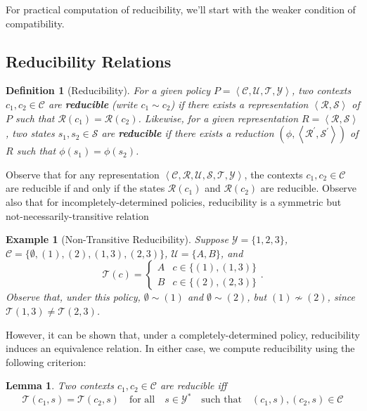 \documentclass[a4paper,10pt]{article}
\def\1{^{\prime}}
\def\T{\mathcal{T}}
\def\Y{\mathcal{Y}}
\def\C{\mathcal{C}}
\def\U{\mathcal{U}}
\def\R{\mathcal{R}}
\def\S{\mathcal{S}}
\def\ang#1{\left\langle#1\right\rangle}
\def\qtx#1{\quad\text{#1}\quad}
\newtheorem{example}{Example}
\newtheorem{definition}{Definition}
\newtheorem{lemma}{Lemma}
\begin{document}
\begin{figure}[ht]
\begin{floatrow}
{{}{}}
\end{floatrow}
\end{figure}
For practical computation of reducibility, we'll start with the weaker condition of compatibility.

\subsection{Reducibility Relations}

\begin{definition}[Reducibility]
For a given policy $P=\ang{\C,\U,\T,\Y}$, two contexts $c_1, c_2\in\C$ are \textbf{reducible} (write $c_1\sim c_2$) if there exists a representation 
$\ang{\R,\S}$ of $P$ such that $\R(c_1)=\R(c_2)$.  Likewise, for a given representation $R=\ang{\R,\S}$, two states 
$s_1,s_2\in\S$ are \textbf{reducible} if there exists a reduction $(\phi, \ang{\R\1,\S\1})$ of $R$ such that
$\phi(s_1)=\phi(s_2)$.
\end{definition}
Observe that for any representation $\ang{\C,\R,\U,\S,\T,\Y}$,
the contexts $c_1, c_2\in\C$ are reducible if and only if the states $\R(c_1)$ and $\R(c_2)$ are reducible.
Observe also that for incompletely-determined policies, reducibility is a symmetric but not-necessarily-transitive relation
\begin{example}[Non-Transitive Reducibility]
Suppose $\Y=\{1,2,3\}$, $\C=\{\emptyset, (1), (2), (1,3), (2,3)\}$, \mbox{$\U=\{A,B\}$}, and 
\begin{equation}
\T(c) = \begin{cases}
A&c\in\{(1), (1,3)\}\\
B&c\in\{(2), (2,3)\}
\end{cases}.
\end{equation} 
Observe that, under this policy, $\emptyset\sim(1)$ and $\emptyset\sim(2)$, but $(1)\not\sim(2)$, 
since $\T(1,3)\neq\T(2,3)$.
\end{example}
However, it can be shown that, under a completely-determined policy, reducibility induces an equivalence relation.  
In either case, we compute reducibility using the following criterion:
\begin{lemma}
Two contexts $c_1,c_2\in\C$ are reducible iff 
\begin{equation}
\T(c_1,s)=\T(c_2,s)\qtx{for all}s\in\Y^*\qtx{such that}(c_1,s),(c_2,s)\in\C
\end{equation} 
\end{lemma}
\end{document}
